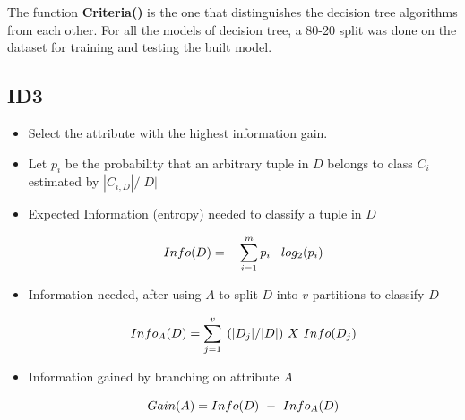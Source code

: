 The function \textbf{Criteria()} is the one that distinguishes the decision tree algorithms from each other. For all the models of decision tree, a 80-20 split was done on the dataset for training and testing the built model.

\subsection{ID3}
\begin{itemize}
    \item Select the attribute with the highest information gain.
    \item Let $p_i$ be the probability that an arbitrary tuple in $D$ belongs to class $C_i$ estimated by $ |C_{i,D}| / |D| $
    
    \newpage
    
    
    \item Expected Information (entropy) needed to classify a tuple in $D$
  
    \[ Info(D) = -\sum_{i=1}^{m} p_i \hspace{0.3cm} log_2(p_i) \]
    
    \item Information needed, after using $A$ to split $D$ into $v$ partitions to classify $D$
    
    \[ Info_A(D) = \sum_{j=1}^{v} \hspace{0.15cm} (|D_j| / |D|)
    \hspace{0.12cm} X \hspace{0.12cm} Info(D_j) \]
    
    \item Information gained by branching on attribute $A$
    
    \[ Gain(A) = Info(D) \hspace{0.12cm} - \hspace{0.12cm} Info_A(D)      \]
    
\end{itemize}


